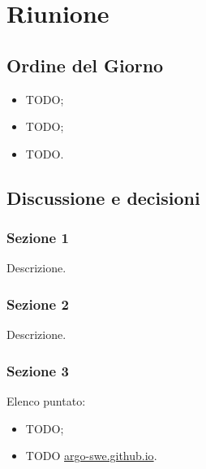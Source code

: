\section{Riunione}
\subsection{Ordine del Giorno}
\begin{itemize}
	\item TODO;
	\item TODO;
	\item TODO.
\end{itemize}

\subsection{Discussione e decisioni}

\subsubsection{Sezione 1}
Descrizione.

\subsubsection{Sezione 2}
Descrizione.

\subsubsection{Sezione 3}
Elenco puntato:
\begin{itemize}
	\item TODO;
	\item TODO \href{https://argo-swe.github.io}{argo-swe.github.io}.
\end{itemize}
\clearpage
